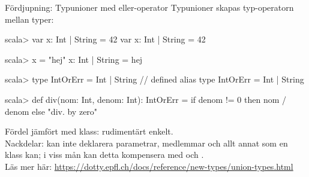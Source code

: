 \begin{Slide}{Fördjupning: Typunioner med eller-operator}\SlideFontSmall
Typunioner skapas typ-operatorn \code{|} mellan typer: 
\begin{REPLsmall}
scala> var x: Int | String = 42
var x: Int | String = 42

scala> x = "hej" 
x: Int | String = hej

scala> type IntOrErr = Int | String
// defined alias type IntOrErr = Int | String

scala> def div(nom: Int, denom: Int): IntOrErr = 
          if denom != 0 then nom / denom else "div. by zero"
\end{REPLsmall}
Fördel jämfört med klass: rudimentärt enkelt.\\ Nackdelar: kan inte deklarera parametrar, medlemmar och allt annat som en klass kan; i viss mån kan detta kompensera med  och .\\ 
{\SlideFontTiny Läs mer här:
\url{https://dotty.epfl.ch/docs/reference/new-types/union-types.html}
}
\end{Slide}



